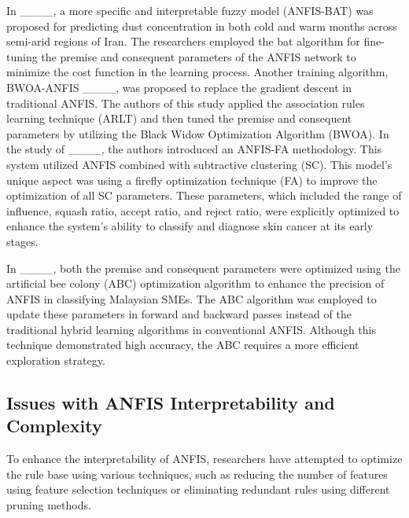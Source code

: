 In ____, a more specific and interpretable fuzzy model (ANFIS-BAT) was proposed for predicting dust concentration in both cold and warm months across semi-arid regions of Iran. The researchers employed the bat algorithm for fine-tuning the premise and consequent parameters of the ANFIS network to minimize the cost function in the learning process. Another training algorithm, BWOA-ANFIS ____, was proposed to replace the gradient descent in traditional ANFIS. The authors of this study applied the association rules learning technique (ARLT) and then tuned the premise and consequent parameters by utilizing the Black Widow Optimization Algorithm (BWOA).
In the study of  ____, the authors introduced an ANFIS-FA methodology. This system utilized ANFIS  combined with subtractive clustering (SC). This model's unique aspect was using a firefly optimization technique (FA) to improve the optimization of all SC parameters. These parameters, which included the range of influence, squash ratio, accept ratio, and reject ratio, were explicitly optimized to enhance the system's ability to classify and diagnose skin cancer at its early stages.

In ____, both the premise and consequent parameters were optimized using the artificial bee colony (ABC) optimization algorithm to enhance the precision of ANFIS in classifying Malaysian SMEs. The ABC algorithm was employed to update these parameters in forward and backward passes instead of the traditional hybrid learning algorithms in conventional ANFIS. Although this technique demonstrated high accuracy, the ABC requires a more efficient exploration strategy.

\subsection{Issues with ANFIS Interpretability and Complexity}\label{related2}

To enhance the interpretability of ANFIS, researchers have attempted to optimize the rule base using various techniques, such as reducing the number of features using feature selection techniques or eliminating redundant rules using different pruning methods.

